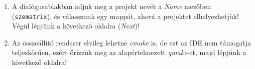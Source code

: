 \begin{frame}
  \begin{enumerate}
    \setcounter{enumi}{\theqt}
    \item A dialógusablakban adjuk meg a projekt nevét a \emph{Name} mezőben (\texttt{szematrix}), és válasszunk egy mappát, ahová a projektet elhelyezhetjük! Végül lépjünk a következő oldalra (\emph{Next})!\\
    \item Az összeállító rendszer elvileg lehetne \emph{cmake} is, de ezt az IDE nem támogatja teljeskörűen, ezért őrizzük meg az alapértelmezett \emph{qmake}-et, majd lépjünk a következő oldalra!\\
    \setcounter{qt}{\theenumi}
  \end{enumerate}
\end{frame}

